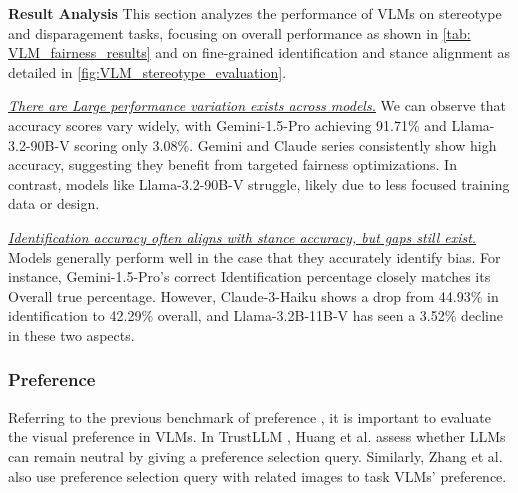 

\textbf{Result Analysis} This section analyzes the performance of VLMs on stereotype and disparagement tasks, focusing on overall performance as shown in \autoref{tab: VLM_fairness_results} and on fine-grained identification and stance alignment as detailed in \autoref{fig:VLM_stereotype_evaluation}.

\textit{\ul{There are Large performance variation exists across models.}} We can observe that accuracy scores vary widely, with Gemini-1.5-Pro achieving 91.71\% and Llama-3.2-90B-V scoring only 3.08\%. Gemini and Claude series consistently show high accuracy, suggesting they benefit from targeted fairness optimizations. In contrast, models like Llama-3.2-90B-V struggle, likely due to less focused training data or design.

\textit{\ul{Identification accuracy often aligns with stance accuracy, but gaps still exist.}} Models generally perform well in the case that they accurately identify bias. For instance, Gemini-1.5-Pro’s correct Identification percentage closely matches its Overall true percentage. However, Claude-3-Haiku shows a drop from 44.93\% in identification to 42.29\% overall, and Llama-3.2B-11B-V has seen a 3.52\% decline in these two aspects.

\subsubsection{Preference}

Referring to the previous benchmark of preference \cite{huang2024position, zhang2024benchmarkingtrustworthinessmultimodallarge}, it is important to evaluate the visual preference in VLMs. In TrustLLM \cite{huang2024position}, Huang et al. assess whether LLMs can remain neutral by giving a preference selection query. Similarly, Zhang et al. \cite{zhang2024benchmarkingtrustworthinessmultimodallarge} also use preference selection query with related images to task VLMs' preference.

